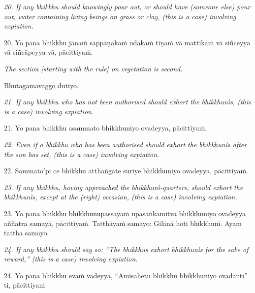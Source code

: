 \documentclass[11pt]{article}
\begin{document}
\begin{paracol}{2}
\begin{column}
{\itshape\footnotesize
20. If any bhikkhu should knowingly pour out, or should have (someone else) pour out, water containing living beings on grass or clay, (this is a case) involving expiation.
}
\switchcolumn

\begin{flushleft}
20. Yo pana bhikkhu jānaṁ sappāṇakaṁ udakaṁ tiṇaṁ vā mattikaṁ vā siñceyya vā siñcāpeyya vā, pācittiyaṁ.
\switchcolumn*
\end{flushleft}

{\itshape\footnotesize
The section [starting with the rule] on vegetation is second.
}
\switchcolumn

\begin{flushleft}
Bhūtagāmavaggo dutiyo.
\switchcolumn*
\end{flushleft}

{\itshape\footnotesize
21. If any bhikkhu who has not been authorised should exhort the bhikkhunìs, (this is a case) involving expiation.
}
\switchcolumn

\begin{flushleft}
21. Yo pana bhikkhu asammato bhikkhuniyo ovadeyya, pācittiyaṁ.
\switchcolumn*
\end{flushleft}

{\itshape\footnotesize
22. Even if a bhikkhu who has been authorised should exhort the bhikkhunìs after the sun has set, (this is a case) involving expiation.
}
\switchcolumn

\begin{flushleft}
22. Sammato’pi ce bhikkhu atthaṅgate suriye bhikkhuniyo ovadeyya, pācittiyaṁ.
\switchcolumn*
\end{flushleft}

{\itshape\footnotesize
23. If any bhikkhu, having approached the bhikkhunì-quarters, should exhort the bhikkhunìs, except at the (right) occasion, (this is a case) involving expiation.
}
\switchcolumn

\begin{flushleft}
23. Yo pana bhikkhu bhikkhunūpassayaṁ upasaṅkamitvā bhikkhuniyo ovadeyya aññatra samayā, pācittiyaṁ. Tatthāyaṁ samayo: Gilānā hoti bhikkhunī. Ayaṁ tattha samayo.
\switchcolumn*
\end{flushleft}

{\itshape\footnotesize
24. If any bhikkhu should say so: “The bhikkhus exhort bhikkhunìs for the sake of reward,” (this is a case) involving expiation.
}
\switchcolumn

\begin{flushleft}
24. Yo pana bhikkhu evaṁ vadeyya, “Āmisahetu bhikkhū bhikkhuniyo ovadantī” ti, pācittiyaṁ
\switchcolumn*
\end{flushleft}


\end{column}
\end{paracol}
\end{document}
